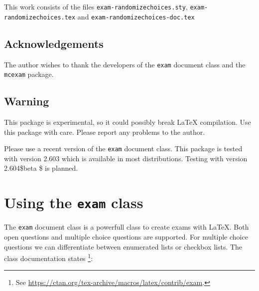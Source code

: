 \documentclass[12pt,a4paper]{exam}
\begin{document}
This work consists of the files \texttt{exam-randomizechoices.sty},
\texttt{exam-randomizechoices.tex} and \texttt{exam-randomizechoices-doc.tex}

\subsection{Acknowledgements}
The author wishes to thank the developers of the \verb|exam| document
class and the \verb|mcexam| package.

\subsection{Warning}
This package is experimental, so it could possibly break \LaTeX{}
compilation. Use this package with care. Please report any problems
to the author.

Please use a recent version of the \texttt{exam} document class. This
package is tested with version 2.603 which is available in most distributions.
Testing with version 2.604\$beta \$ is planned.


\section{Using the \texttt{exam} class}
The \verb|exam| document class is a powerfull class to create exams
with \LaTeX{}. Both open questions and multiple choice questions are
supported. For multiple choice questions we can differentiate between
enumerated lists or checkbox lists. The class documentation states%
\footnote{See \url{https://ctan.org/tex-archive/macros/latex/contrib/exam}.}:
\end{document}
